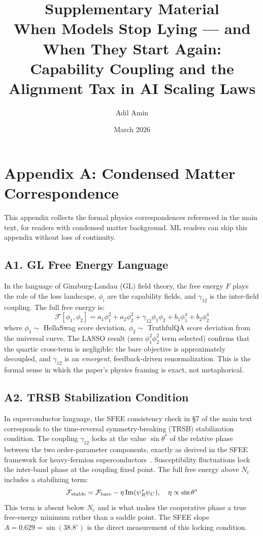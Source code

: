\documentclass[11pt]{article}
\title{\textbf{Supplementary Material}\\
When Models Stop Lying --- and When They Start Again:\\
Capability Coupling and the Alignment Tax in AI Scaling Laws}
\author{Adil Amin}
\date{March 2026}
\begin{document}
\maketitle

\section*{Appendix A: Condensed Matter Correspondence}
\label{app:physics}

This appendix collects the formal physics correspondences referenced in the main text, for readers with condensed matter background.
ML readers can skip this appendix without loss of continuity.

\subsection*{A1. GL Free Energy Language}

In the language of Ginzburg-Landau (GL) field theory, the free energy $F$ plays the role of the loss landscape, $\phi_i$ are the capability fields, and $\gamma_{12}$ is the inter-field coupling.
The full free energy is:
\begin{equation}
  \mathcal{F}[\phi_1, \phi_2] = a_1 \phi_1^2 + a_2 \phi_2^2 + \gamma_{12} \phi_1 \phi_2 + b_1 \phi_1^4 + b_2 \phi_2^4
\end{equation}
where $\phi_1 \sim$ HellaSwag score deviation, $\phi_2 \sim$ TruthfulQA score deviation from the universal curve.
The LASSO result (zero $\phi_1^2\phi_2^2$ term selected) confirms that the quartic cross-term is negligible: the bare objective is approximately decoupled, and $\gamma_{12}$ is an \emph{emergent}, feedback-driven renormalization.
This is the formal sense in which the paper's physics framing is exact, not metaphorical.

\subsection*{A2. TRSB Stabilization Condition}

In superconductor language, the SFEE consistency check in \S7 of the main text corresponds to the time-reversal symmetry-breaking (TRSB) stabilization condition.
The coupling $\gamma_{12}$ locks at the value $\sin\theta^*$ of the relative phase between the two order-parameter components, exactly as derived in the SFEE framework for heavy-fermion superconductors~\cite{amin2020}.
Susceptibility fluctuations lock the inter-band phase at the coupling fixed point.
The full free energy above $N_c$ includes a stabilizing term:
\begin{equation}
  \mathcal{F}_{\rm stable} = \mathcal{F}_{\rm bare} - \eta\,\mathrm{Im}(\psi_R^*\psi_C), \quad \eta \propto \sin\theta^*
\end{equation}
This term is absent below $N_c$ and is what makes the cooperative phase a true free-energy minimum rather than a saddle point.
The SFEE slope $A = 0.629 = \sin(38.8^\circ)$ is the direct measurement of this locking condition.
\end{document}
